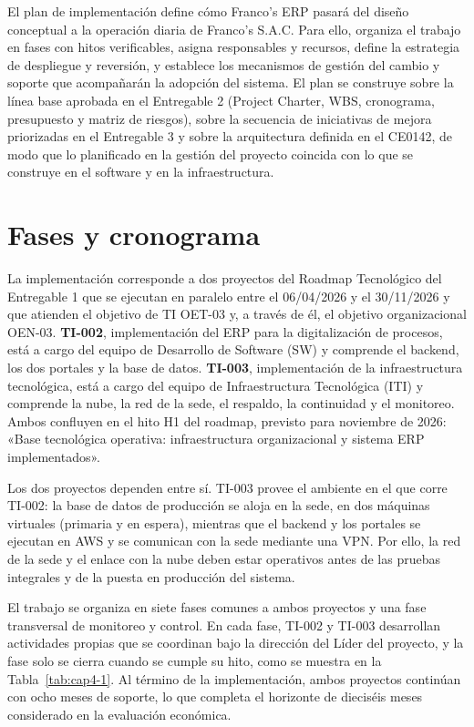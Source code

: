 
El plan de implementación define cómo Franco's ERP pasará del diseño conceptual a la operación diaria de Franco's S.A.C. Para ello, organiza el trabajo en fases con hitos verificables, asigna responsables y recursos, define la estrategia de despliegue y reversión, y establece los mecanismos de gestión del cambio y soporte que acompañarán la adopción del sistema. El plan se construye sobre la línea base aprobada en el Entregable 2 (Project Charter, WBS, cronograma, presupuesto y matriz de riesgos), sobre la secuencia de iniciativas de mejora priorizadas en el Entregable 3 y sobre la arquitectura definida en el CE0142, de modo que lo planificado en la gestión del proyecto coincida con lo que se construye en el software y en la infraestructura.

\section{Fases y cronograma}


La implementación corresponde a dos proyectos del Roadmap Tecnológico del Entregable 1 que se ejecutan en paralelo entre el 06/04/2026 y el 30/11/2026 y que atienden el objetivo de TI OET-03 y, a través de él, el objetivo organizacional OEN-03. \textbf{TI-002}, implementación del ERP para la digitalización de procesos, está a cargo del equipo de Desarrollo de Software (SW) y comprende el backend, los dos portales y la base de datos. \textbf{TI-003}, implementación de la infraestructura tecnológica, está a cargo del equipo de Infraestructura Tecnológica (ITI) y comprende la nube, la red de la sede, el respaldo, la continuidad y el monitoreo. Ambos confluyen en el hito H1 del roadmap, previsto para noviembre de 2026: «Base tecnológica operativa: infraestructura organizacional y sistema ERP implementados».

Los dos proyectos dependen entre sí. TI-003 provee el ambiente en el que corre TI-002: la base de datos de producción se aloja en la sede, en dos máquinas virtuales (primaria y en espera), mientras que el backend y los portales se ejecutan en AWS y se comunican con la sede mediante una VPN. Por ello, la red de la sede y el enlace con la nube deben estar operativos antes de las pruebas integrales y de la puesta en producción del sistema.

El trabajo se organiza en siete fases comunes a ambos proyectos y una fase transversal de monitoreo y control. En cada fase, TI-002 y TI-003 desarrollan actividades propias que se coordinan bajo la dirección del Líder del proyecto, y la fase solo se cierra cuando se cumple su hito, como se muestra en la Tabla~\ref{tab:cap4-1}. Al término de la implementación, ambos proyectos continúan con ocho meses de soporte, lo que completa el horizonte de dieciséis meses considerado en la evaluación económica.


